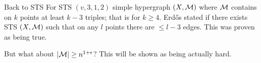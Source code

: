\begin{topic}{Back to STS}
	For STS $(v,3,1,2)$ simple hypergraph $(X, \mathcal{M})$ where $\mathcal{M}$ contains on $k$ points at least $k-3$ triples; that is for $k \geq 4$. Erd\H os stated if there exists STS $(X, \mathcal{M})$ such that on any $l$ points there are $\leq l-3$ edges. This was proven as being true.
	
	But what about $|\mathcal{M}| \geq n^{1 + \epsilon}$? This will be shown as being actually hard. 
\end{topic}